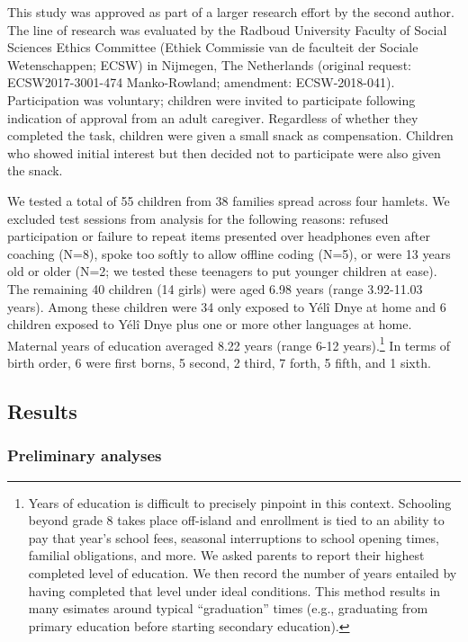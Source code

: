 \documentclass[english,,man,floatsintext]{apa6}
\begin{document}
This study was approved as part of a larger research effort by the
second author. The line of research was evaluated by the Radboud
University Faculty of Social Sciences Ethics Committee (Ethiek Commissie
van de faculteit der Sociale Wetenschappen; ECSW) in Nijmegen, The
Netherlands (original request: ECSW2017-3001-474 Manko-Rowland;
amendment: ECSW-2018-041). Participation was voluntary; children were
invited to participate following indication of approval from an adult
caregiver. Regardless of whether they completed the task, children were
given a small snack as compensation. Children who showed initial
interest but then decided not to participate were also given the snack.

We tested a total of 55 children from 38 families spread across four
hamlets. We excluded test sessions from analysis for the following
reasons: refused participation or failure to repeat items presented over
headphones even after coaching (N=8), spoke too softly to allow offline
coding (N=5), or were 13 years old or older (N=2; we tested these
teenagers to put younger children at ease). The remaining 40 children
(14 girls) were aged 6.98 years (range 3.92-11.03 years). Among these
children were 34 only exposed to Yélî Dnye at home and 6 children
exposed to Yélî Dnye plus one or more other languages at home. Maternal
years of education averaged 8.22 years (range 6-12 years).\footnote{Years
  of education is difficult to precisely pinpoint in this context.
  Schooling beyond grade 8 takes place off-island and enrollment is tied
  to an ability to pay that year's school fees, seasonal interruptions
  to school opening times, familial obligations, and more. We asked
  parents to report their highest completed level of education. We then
  record the number of years entailed by having completed that level
  under ideal conditions. This method results in many esimates around
  typical ``graduation'' times (e.g., graduating from primary education
  before starting secondary education).} In terms of birth order, 6 were
first borns, 5 second, 2 third, 7 forth, 5 fifth, and 1 sixth.

\subsection{Results}\label{results}

\subsubsection{Preliminary analyses}\label{preliminary-analyses}
\end{document}
